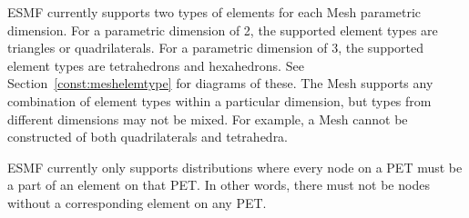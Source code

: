 ESMF currently supports two types of elements for each Mesh parametric dimension. For a 
parametric dimension of 2, the supported element types are triangles or quadrilaterals. For 
a parametric dimension of 3, the supported element types are tetrahedrons
and hexahedrons. See Section~\ref{const:meshelemtype} for diagrams of these. The Mesh 
supports any combination of element types within a particular dimension, but types from 
different dimensions may not be mixed.  For example, a Mesh cannot be constructed of both 
quadrilaterals and tetrahedra.

ESMF currently only supports distributions where every node on a PET must be a part of an 
element on that PET. In other words, there must not be nodes without a corresponding element 
on any PET.
